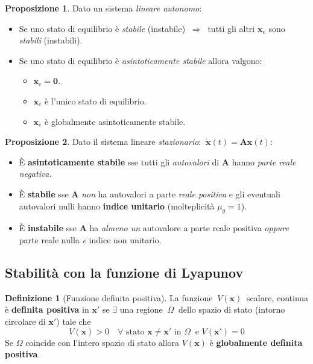 \documentclass[a4paper]{article}
\renewcommand{\vec}{\bm}
\theoremstyle{definition}
\newtheorem{defn}{Definizione}[subsection]
\newtheorem{prop}{Proposizione}[subsection]
\begin{document}
				\begin{prop}
					Dato un sistema \textit{lineare autonomo}:
					\begin{itemize}
						\item Se uno stato di equilibrio è \textit{stabile} (instabile) $\ \Rightarrow\ $ tutti gli altri $ \vec{x}_e $ sono \textit{stabili} (instabili).
						\item Se uno stato di equilibrio è \textit{asintoticamente stabile} allora valgono:
						\begin{itemize}
							\item $ \vec{x}_e = \vec{0} $.
							\item $ \vec{x}_e $ è l'unico stato di equilibrio.
							\item $ \vec{x}_e $ è globalmente asintoticamente stabile.
						\end{itemize}
					\end{itemize}
				\end{prop}
				
				\begin{prop}
					Dato il sistema lineare \textit{stazionario}: $ \ \dot{\vec{x}}(t) = \vec{A}\vec{x}(t) $:
					\begin{itemize}
						\item È \textbf{asintoticamente stabile} sse tutti gli \textit{autovalori} di $ \vec{A} $ hanno \textit{parte reale negativa}.
						\item È \textbf{stabile} sse $ \vec{A} $ \textit{non} ha autovalori a parte \textit{reale positiva} e gli eventuali autovalori nulli hanno \textbf{indice unitario} (molteplicità $ \mu_g = 1 $).
						\item È \textbf{instabile} sse $ \vec{A} $ ha \textit{almeno un} autovalore a parte reale positiva \textit{oppure} parte reale nulla \textit{e} indice non unitario.
					\end{itemize}
				\end{prop}
				
			\subsection{Stabilità con la funzione di Lyapunov}
				\begin{defn}[Funzione definita positiva]
					La funzione $\ V(\vec{x})\ $ scalare, continua è \textbf{definita positiva} in $ \vec{x}' $ se $ \exists $ una regione $\ \Omega\ $ dello spazio di stato (intorno circolare di $ \vec{x}' $) tale che
					\[
						V(\vec{x}) > 0 \quad \forall \text{ stato } \vec{x}\neq \vec{x}' \text{ in } \Omega\ \text{ e } V(\vec{x}') = 0
					\]
					Se $ \Omega $ coincide con l'intero spazio di stato allora $ V(\vec{x}) $ è \textbf{globalmente definita positiva}.
				\end{defn}
				
\end{document}

